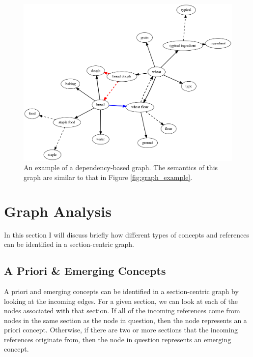 \documentclass[12pt]{article}
\begin{document}
\begin{figure}
    \centering
    \includegraphics[width=\linewidth]{figures/dependency_graph.png}
    \caption{An example of a dependency-based graph. The semantics of this graph are similar to that in Figure \ref{fig:graph_example}.}
    \label{fig:dependency_graph_example}
\end{figure}

\section{Graph Analysis} \label{sec:graph analysis}
In this section I will discuss briefly how different types of concepts and references can be identified in a section-centric graph.

\subsection{A Priori \& Emerging Concepts}
A priori and emerging concepts can be identified in a section-centric graph by looking at the incoming edges. For a given section, we can look at each of the nodes associated with that section. If all of the incoming references come from nodes in the same section as the node in question, then the node represents an a priori concept. Otherwise, if there are two or more sections that the incoming references originate from, then the node in question represents an emerging concept.
\end{document}
